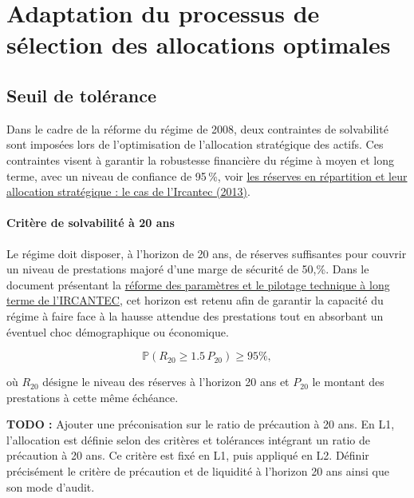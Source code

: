 \documentclass[11pt,a4paper]{article}
\begin{document}
\clearpage
\section{Adaptation du processus de sélection des allocations optimales}

\subsection{Seuil de tolérance}

Dans le cadre de la réforme du régime de 2008, deux contraintes de solvabilité sont imposées lors de l'optimisation de l'allocation stratégique des actifs. Ces contraintes visent à garantir la robustesse financière du régime à moyen et long terme, avec un niveau de confiance de 95\,\%, voir \href{https://www.cor-retraites.fr/sites/default/files/2019-06/doc-2104.pdf}{\textcolor{nexnavy}{les réserves en répartition et leur allocation stratégique : le cas de l’Ircantec (2013)}}.

\paragraph{Critère de solvabilité à 20 ans}

Le régime doit disposer, à l'horizon de 20 ans, de réserves suffisantes pour couvrir un niveau de prestations majoré d'une marge de sécurité de 50,\%. Dans le document présentant la \href{https://www.cor-retraites.fr/sites/default/files/2019-06/doc-1083.pdf}{\textcolor{nexnavy}{réforme des paramètres et le pilotage technique à long terme de l'IRCANTEC}}, cet horizon est retenu afin de garantir la capacité du régime à faire face à la hausse attendue des prestations tout en absorbant un éventuel choc démographique ou économique.

\begin{equation}
\mathbb{P}\left(R_{20} \geq 1.5\, P_{20}\right) \geq 95\%,
\end{equation}

où $R_{20}$ désigne le niveau des réserves à l'horizon 20 ans et $P_{20}$ le montant des prestations à cette même échéance.

{\color{red}\textbf{TODO :} Ajouter une préconisation sur le ratio de précaution à 20 ans. En L1, l'allocation est définie selon des critères et tolérances intégrant un ratio de précaution à 20 ans. Ce critère est fixé en L1, puis appliqué en L2. Définir précisément le critère de précaution et de liquidité à l'horizon 20 ans ainsi que son mode d'audit.}
\end{document}
